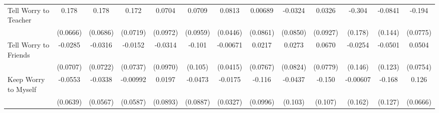 {\begin{tabular}{l*{12}{c}}
\addlinespace
Tell Worry to Teacher&       0.178\sym{**} &       0.178\sym{**} &       0.172\sym{*}  &      0.0704         &      0.0709         &      0.0813         &     0.00689         &     -0.0324         &      0.0326         &      -0.304         &     -0.0841         &      -0.194\sym{*}  \\
            &    (0.0666)         &    (0.0686)         &    (0.0719)         &    (0.0972)         &    (0.0959)         &    (0.0446)         &    (0.0861)         &    (0.0850)         &    (0.0927)         &     (0.178)         &     (0.144)         &    (0.0775)         \\
\addlinespace
Tell Worry to Friends&     -0.0285         &     -0.0316         &     -0.0152         &     -0.0314         &      -0.101         &    -0.00671         &      0.0217         &      0.0273         &      0.0670         &     -0.0254         &     -0.0501         &      0.0504         \\
            &    (0.0707)         &    (0.0722)         &    (0.0737)         &    (0.0970)         &     (0.105)         &    (0.0415)         &    (0.0767)         &    (0.0824)         &    (0.0779)         &     (0.146)         &     (0.123)         &    (0.0754)         \\
\addlinespace
Keep Worry to Myself&     -0.0553         &     -0.0338         &    -0.00992         &      0.0197         &     -0.0473         &     -0.0175         &      -0.116         &     -0.0437         &      -0.150         &    -0.00607         &      -0.168         &       0.126         \\
            &    (0.0639)         &    (0.0567)         &    (0.0587)         &    (0.0893)         &    (0.0887)         &    (0.0327)         &    (0.0996)         &     (0.103)         &     (0.107)         &     (0.162)         &     (0.127)         &    (0.0666)         \\
\bottomrule
\end{tabular}
}
